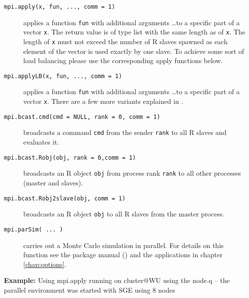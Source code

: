 \begin{description}
\item[\texttt{mpi.apply(x, fun, ..., comm = 1)}] applies a function
  \texttt{fun} with additional arguments \ldots to a specific part of
  a vector \texttt{x}. The return value is of type list with the same
  length as of \texttt{x}. The length of
  \texttt{x} must not exceed the 
  number of R slaves spawned as each element of the vector is used
  exactly by one slave. To achieve some sort of load balancing please
  use the corresponding apply functions below.
\item[\texttt{mpi.applyLB(x, fun, ..., comm = 1)}] applies a function
  \texttt{fun} with additional arguments \ldots to a specific part of
  a vector \texttt{x}. There are a few more variants explained in
  \cite{yu06Rmpi}.
\item[\texttt{mpi.bcast.cmd(cmd = NULL, rank = 0, comm = 1)}]
  broadcasts a command \texttt{cmd} from the sender \texttt{rank} to
  all R slaves and evaluates it.
\item[\texttt{mpi.bcast.Robj(obj, rank = 0,comm = 1)}]
  broadcasts an R object \texttt{obj} from process rank \texttt{rank}
  to all other processes (master and slaves).
\item[\texttt{mpi.bcast.Robj2slave(obj, comm = 1)}] broadcasts an R
  object \texttt{obj} to all R slaves from the master process. 
\item[\texttt{mpi.parSim( ... )}] carries out a Monte Carlo simulation
  in parallel. For details on this function see the package manual
  (\cite{yu06Rmpi}) and
  the applications in chapter \ref{chap:options}.
\end{description}


\textbf{Example:} Using mpi.apply\newline
running on cluster@WU using the node.q -- the parallel environment was
started with SGE using 8 nodes

